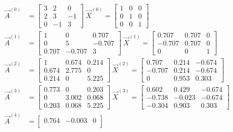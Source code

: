 \documentclass{homework}
\begin{document}
		\begin{align*}
		\vec{A}^{(0)} &= \begin{bmatrix}
		3 & 2 & 0\\
		2 & 3 & -1\\
		0 & -1 & 3
		\end{bmatrix}~
		\vec{X}^{(0)} = \begin{bmatrix}
		1 & 0 & 0\\
		0 & 1 & 0\\
		0 & 0 & 1
		\end{bmatrix}\\[1cm]
		\vec{A}^{(1)} &= \begin{bmatrix}
		1 & 0 & 0.707\\
		0 & 5 & -0.707\\
		0.707 & -0.707 & 3
		\end{bmatrix}~
		\vec{X}^{(1)} = \begin{bmatrix}
		0.707 & 0.707 & 0\\
		-0.707 & 0.707 & 0\\
		0 & 0 & 1
		\end{bmatrix}\\[1cm]
		\vec{A}^{(2)} &= \begin{bmatrix}
		1 & 0.674 & 0.214\\
		0.674 & 2.775 & 0\\
		0.214 & 0 & 5.225
		\end{bmatrix}~
		\vec{X}^{(2)} = \begin{bmatrix}
		0.707 & 0.214 & -0.674\\
		-0.707 & 0.214 & -0.674\\
		0 & 0.953 & 0.303
		\end{bmatrix}\\[1cm]
		\vec{A}^{(3)} &= \begin{bmatrix}
		0.773 & 0 & 0.203\\
		0 & 3.002 & 0.068\\
		0.203 & 0.068 & 5.225
		\end{bmatrix}~
		\vec{X}^{(3)} = \begin{bmatrix}
		0.602 & 0.429 & -0.674\\
		-0.738 & -0.023 & -0.674\\
		-0.304 & 0.903 & 0.303
		\end{bmatrix}\\[1cm]
		\vec{A}^{(4)} &= \begin{bmatrix}
		0.764 & -0.003 & 0\\

\end{bmatrix}
\end{align*}
\end{document}
